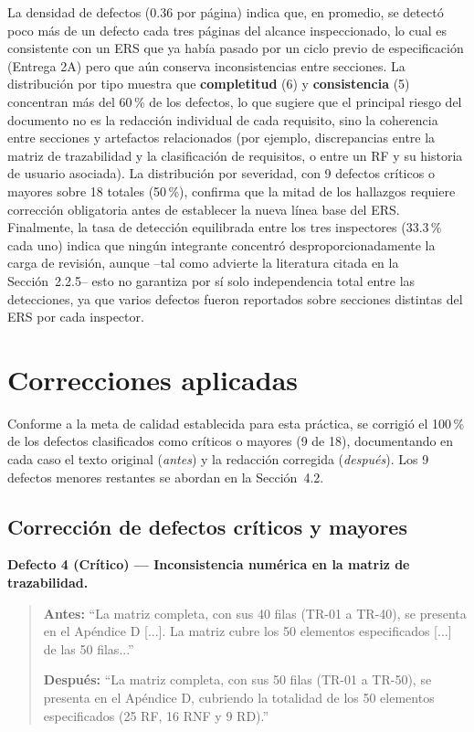 \documentclass[journal,onecolumn]{IEEEtran}
\begin{document}
	La densidad de defectos (0.36 por página) indica que, en promedio, se detectó poco más de un defecto cada tres páginas del alcance inspeccionado, lo cual es consistente con un ERS que ya había pasado por un ciclo previo de especificación (Entrega 2A) pero que aún conserva inconsistencias entre secciones. La distribución por tipo muestra que \textbf{completitud} (6) y \textbf{consistencia} (5) concentran más del 60\,\% de los defectos, lo que sugiere que el principal riesgo del documento no es la redacción individual de cada requisito, sino la coherencia entre secciones y artefactos relacionados (por ejemplo, discrepancias entre la matriz de trazabilidad y la clasificación de requisitos, o entre un RF y su historia de usuario asociada). La distribución por severidad, con 9 defectos críticos o mayores sobre 18 totales (50\,\%), confirma que la mitad de los hallazgos requiere corrección obligatoria antes de establecer la nueva línea base del ERS. Finalmente, la tasa de detección equilibrada entre los tres inspectores (33.3\,\% cada uno) indica que ningún integrante concentró desproporcionadamente la carga de revisión, aunque --tal como advierte la literatura citada en la Sección~2.2.5-- esto no garantiza por sí solo independencia total entre las detecciones, ya que varios defectos fueron reportados sobre secciones distintas del ERS por cada inspector.
	

	\section{Correcciones aplicadas}

Conforme a la meta de calidad establecida para esta práctica, se corrigió el 100\,\% de los defectos clasificados como críticos o mayores (9 de 18), documentando en cada caso el texto original (\textit{antes}) y la redacción corregida (\textit{después}). Los 9 defectos menores restantes se abordan en la Sección~4.2.

\subsection{Corrección de defectos críticos y mayores}

\textbf{Defecto 4 (Crítico) --- Inconsistencia numérica en la matriz de trazabilidad.}

\begin{quote}
	\textbf{Antes:} ``La matriz completa, con sus 40 filas (TR-01 a TR-40), se presenta en el Apéndice D [...]. La matriz cubre los 50 elementos especificados [...] de las 50 filas...''
	
	\textbf{Después:} ``La matriz completa, con sus 50 filas (TR-01 a TR-50), se presenta en el Apéndice D, cubriendo la totalidad de los 50 elementos especificados (25 RF, 16 RNF y 9 RD).''
\end{quote}
\end{document}
